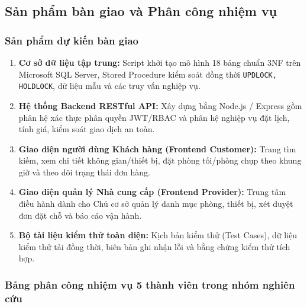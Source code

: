\subsection{Sản phẩm bàn giao và Phân công nhiệm vụ}

\subsubsection{Sản phẩm dự kiến bàn giao}
\begin{enumerate}[leftmargin=2em]
    \item \textbf{Cơ sở dữ liệu tập trung:} Script khởi tạo mô hình 18 bảng chuẩn 3NF trên Microsoft SQL Server, Stored Procedure kiểm soát đồng thời \texttt{UPDLOCK, HOLDLOCK}, dữ liệu mẫu và các truy vấn nghiệp vụ.
    \item \textbf{Hệ thống Backend RESTful API:} Xây dựng bằng Node.js / Express gồm phân hệ xác thực phân quyền JWT/RBAC và phân hệ nghiệp vụ đặt lịch, tính giá, kiểm soát giao dịch an toàn.
    \item \textbf{Giao diện người dùng Khách hàng (Frontend Customer):} Trang tìm kiếm, xem chi tiết không gian/thiết bị, đặt phòng tối/phòng chụp theo khung giờ và theo dõi trạng thái đơn hàng.
    \item \textbf{Giao diện quản lý Nhà cung cấp (Frontend Provider):} Trung tâm điều hành dành cho Chủ cơ sở quản lý danh mục phòng, thiết bị, xét duyệt đơn đặt chỗ và báo cáo vận hành.
    \item \textbf{Bộ tài liệu kiểm thử toàn diện:} Kịch bản kiểm thử (Test Cases), dữ liệu kiểm thử tải đồng thời, biên bản ghi nhận lỗi và bằng chứng kiểm thử tích hợp.
\end{enumerate}

\subsubsection{Bảng phân công nhiệm vụ 5 thành viên trong nhóm nghiên cứu}

